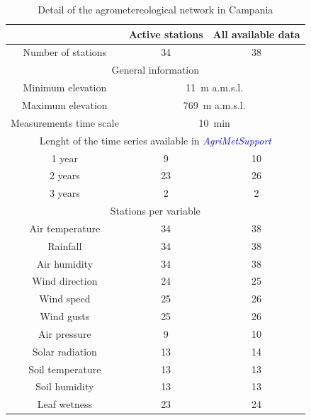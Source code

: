 \documentclass[authoryear,preprint,review,12pt]{elsarticle}
\newcommand{\update}[1]{\emph{\textcolor{blue}{#1}}}
\newcommand{\gci}{\update{AgriMetSupport}\xspace}
\begin{document}
\begin{table}[]
    \centering
    \begin{tabular}{c|c|c}
        & \textbf{Active stations} & \textbf{All available data} \\ 
        \hline
        Number of stations & 34 & 38 \\
        \hline
        \multicolumn{3}{c}{General information} \\
        \hline
        Minimum elevation & \multicolumn{2}{c}{\SI{11}{\metre} a.m.s.l.}\\
        Maximum elevation & \multicolumn{2}{c}{\SI{769}{\metre} a.m.s.l.} \\
        Measurements time scale & \multicolumn{2}{c}{\SI{10}{\minute}} \\
        \hline
        \multicolumn{3}{c}{Lenght of the time series available in \gci} \\
        \hline
        1 year & 9 & 10 \\
        2 years & 23 & 26 \\
        3 years & 2 & 2 \\
        \hline
        \multicolumn{3}{c}{Stations per variable} \\
        \hline
        Air temperature & 34 & 38 \\
        Rainfall & 34 & 38\\
        Air humidity & 34 & 38\\
        Wind direction & 24 & 25\\
        Wind speed & 25 & 26\\
        Wind gusts & 25 & 26\\
        Air pressure & 9 & 10\\
        Solar radiation & 13 & 14\\
        Soil temperature & 13 & 13\\
        Soil humidity & 13 & 13\\
        Leaf wetness & 23 & 24 
    \end{tabular}
    \caption{Detail of the agrometereological network in Campania}
    \label{tab:rarSummary}
\end{table}
\end{document}

